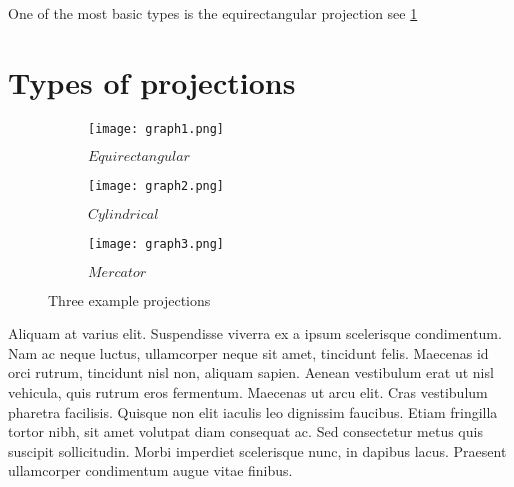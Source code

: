 One of the most basic types is the equirectangular projection see \ref{fig:equirectangular}

\pagestyle{fancy}

\section{Types of projections}



\begin{figure}[h]
	\centering
	\begin{subfigure}[b]{0.3\textwidth}
		\centering
		\texttt{[image: graph1.png]}
		\caption{$Equirectangular$}
		\label{fig:equirectangular}
	\end{subfigure}
	\hfill
	\begin{subfigure}[b]{0.3\textwidth}
		\centering
		\texttt{[image: graph2.png]}
		\caption{$Cylindrical$}
		\label{fig:cylindrical}
	\end{subfigure}
	\hfill
	\begin{subfigure}[b]{0.3\textwidth}
		\centering
		\texttt{[image: graph3.png]}
		\caption{$Mercator$}
		\label{fig:mercator}
	\end{subfigure}
	\caption{Three example projections}
	\label{fig:three_projections}
\end{figure}

Aliquam at varius elit. Suspendisse viverra ex a ipsum scelerisque condimentum. Nam ac neque luctus, ullamcorper neque sit amet, tincidunt felis. Maecenas id orci rutrum, tincidunt nisl non, aliquam sapien. Aenean vestibulum erat ut nisl vehicula, quis rutrum eros fermentum. Maecenas ut arcu elit. Cras vestibulum pharetra facilisis. Quisque non elit iaculis leo dignissim faucibus. Etiam fringilla tortor nibh, sit amet volutpat diam consequat ac. Sed consectetur metus quis suscipit sollicitudin. Morbi imperdiet scelerisque nunc, in dapibus lacus. Praesent ullamcorper condimentum augue vitae finibus. 